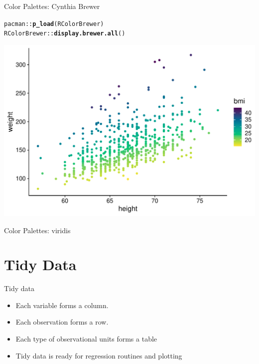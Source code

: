 \documentclass[10pt]{beamer}\usepackage[]{graphicx}\usepackage[]{color}
\makeatletter
\def\maxwidth{ %
  \ifdim\Gin@nat@width>\linewidth
    \linewidth
  \else
    \Gin@nat@width
  \fi
}
\newcommand{\hlopt}[1]{\textcolor[rgb]{0,0,0}{#1}}%
\newcommand{\hlstd}[1]{\textcolor[rgb]{0.345,0.345,0.345}{#1}}%
\newcommand{\hlkwd}[1]{\textcolor[rgb]{0.737,0.353,0.396}{\textbf{#1}}}%
\newenvironment{kframe}{%
 \def\at@end@of@kframe{}%
 \ifinner\ifhmode%
  \def\at@end@of@kframe{\end{minipage}}%
  \begin{minipage}{\columnwidth}%
 \fi\fi%
 \def\FrameCommand##1{\hskip\@totalleftmargin \hskip-\fboxsep
 \colorbox{shadecolor}{##1}\hskip-\fboxsep
     \hskip-\linewidth \hskip-\@totalleftmargin \hskip\columnwidth}%
 \MakeFramed {\advance\hsize-\width
   \@totalleftmargin\z@ \linewidth\hsize
   \@setminipage}}%
 {\par\unskip\endMakeFramed%
 \at@end@of@kframe}
\newenvironment{knitrout}{}{} %
\makeatother
\begin{document}
\begin{frame}[fragile]{Color Palettes: Cynthia Brewer}
	
\begin{knitrout}\tiny
{}\color{fgcolor}\begin{kframe}
\begin{alltt}
\hlstd{pacman}\hlopt{::}\hlkwd{p_load}\hlstd{(RColorBrewer)}
\hlstd{RColorBrewer}\hlopt{::}\hlkwd{display.brewer.all}\hlstd{()}
\end{alltt}
\end{kframe}

{\centering \includegraphics[width=\maxwidth]{figure/unnamed-chunk-4-1} 

}



\end{knitrout}
	
	
\end{frame}



\begin{frame}[fragile]{Color Palettes: viridis}
	
	
	
	
	
\end{frame}

\section{Tidy Data}

\begin{frame}{Tidy data}
	
	\begin{itemize}
		\setlength\itemsep{.51em}
		\item Each variable forms a column.
		\item Each observation forms a row.
		\item Each type of observational units forms a table
		\item Tidy data is ready for regression routines and plotting
	\end{itemize}
	
	
	
\end{frame}
\end{document}
